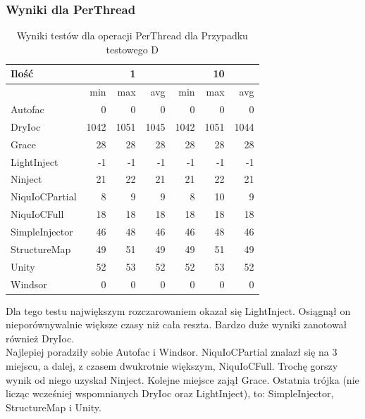 \documentclass[12pt]{article}
\begin{document}
\subsubsection{Wyniki dla PerThread}
\begin{table}[H]
\captionsetup{belowskip=0pt,aboveskip=0pt}
\begin{center}
\begin{small}
	\begin{tabular}{ | l | r r r | r r r | }
    		\hline
Ilość & & 1 & & & 10 & \\ \hline
 & min & max & avg & min & max & avg \\ \hline
Autofac & 0 & 0 & 0 & 0 & 0 & 0 \\ \hline
DryIoc & 1042 & 1051 & 1045 & 1042 & 1051 & 1044 \\ \hline
Grace & 28 & 28 & 28 & 28 & 28 & 28 \\ \hline
LightInject & -1 & -1 & -1 & -1 & -1 & -1 \\ \hline
Ninject & 21 & 22 & 21 & 21 & 22 & 21 \\ \hline
NiquIoCPartial & 8 & 9 & 9 & 8 & 10 & 9 \\ \hline
NiquIoCFull & 18 & 18 & 18 & 18 & 18 & 18 \\ \hline
SimpleInjector & 46 & 48 & 46 & 46 & 48 & 46 \\ \hline
StructureMap & 49 & 51 & 49 & 49 & 51 & 49 \\ \hline
Unity & 52 & 53 & 52 & 52 & 53 & 52 \\ \hline
Windsor & 0 & 0 & 0 & 0 & 0 & 0 \\ \hline
  	\end{tabular}
\end{small}
\end{center}
\caption{Wyniki testów dla operacji PerThread dla Przypadku testowego D}
\label{TestCaseD_PerThread}
\end{table}
Dla tego testu największym rozczarowaniem okazał się LightInject. Osiągnął on nieporównywalnie większe czasy niż cała reszta. Bardzo duże wyniki zanotował również DryIoc.\\
Najlepiej poradziły sobie Autofac i Windsor. NiquIoCPartial znalazł się na 3 miejscu, a dalej, z czasem dwukrotnie większym, NiquIoCFull. Trochę gorszy wynik od niego uzyskał Ninject. Kolejne miejsce zajął Grace. Ostatnia trójka (nie licząc wcześniej wspomnianych DryIoc oraz LightInject), to: SimpleInjector, StructureMap i Unity.
\end{document}

